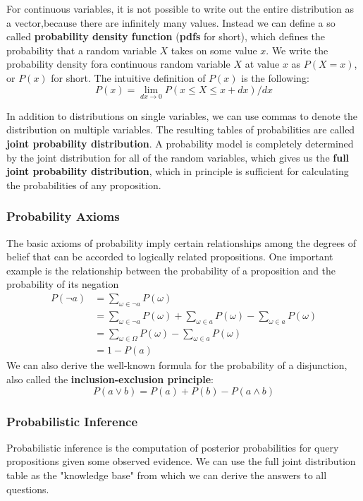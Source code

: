\documentclass{article}
\begin{document}
For continuous variables, it is not possible to write out the entire distribution as a vector,because there are infinitely many values. Instead we can define a so called \textbf{probability density function} (\textbf{pdfs} for short), which defines the probability that a random variable $X$ takes on some value $x$. We write the probability density fora continuous random variable $X$ at value $x$ as $P(X=x)$, or $P(x)$ for short. The intuitive definition of $P(x)$ is the following:
$$P(x) = \lim_{dx\to0}P(x\le X\le x+dx)/dx$$

In addition to distributions on single variables, we can use commas to denote the distribution on multiple variables. The resulting tables of probabilities are called \textbf{joint probability distribution}. A probability model is completely determined by the joint distribution for all of the random variables, which gives us the \textbf{full joint probability distribution}, which in principle is sufficient for calculating the probabilities of any proposition.

\subsubsection{Probability Axioms}
The basic axioms of probability imply certain relationships among the degrees of belief that can be accorded to logically related propositions. One important example is the relationship between the probability of a proposition and the probability of its negation
\begin{align*}
    P(\neg a) &= \sum_{\omega\in \neg a}P(\omega)\\
    &= \sum_{\omega\in \neg a}P(\omega) + \sum_{\omega\in a}P(\omega) - \sum_{\omega\in a}P(\omega)\\
    &= \sum_{\omega\in\Omega}P(\omega) - \sum_{\omega\in a}P(\omega) \\
    &= 1 - P(a)
\end{align*}
We can also derive the well-known formula for the probability of a disjunction, also called the \textbf{inclusion-exclusion principle}:
$$P(a \lor b) = P(a)+P(b)-P(a\land b)$$

\subsubsection{Probabilistic Inference}
Probabilistic inference is the computation of posterior probabilities for query propositions given some observed evidence. We can use the full joint distribution table as the "knowledge base" from which we can derive the answers to all questions.
\end{document}
